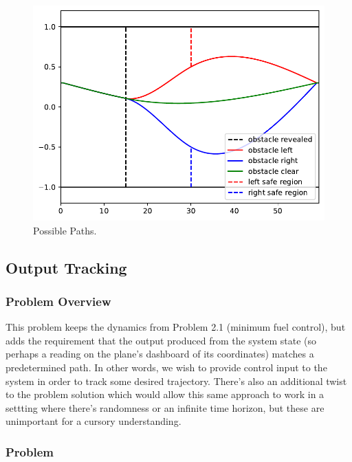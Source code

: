 \documentclass[12pt,reqno]{article}
\theoremstyle{definition}
\numberwithin{equation}{section}
\begin{document}
\begin{figure}[htbp]
    \centering
    \includegraphics[width=\linewidth]{../examples/364a/path_plan_cont.pdf}
    \caption{Possible Paths.}
    \label{fig:path_plan}
\end{figure}

\subsection{Output Tracking}

\subsubsection*{Problem Overview}

This problem keeps the dynamics from Problem 2.1 (minimum fuel control), but 
adds the requirement that the output produced from the system state (so perhaps a reading
on the plane's dashboard of its coordinates) matches a predetermined path. In other words, we
wish to provide control input to the system in order to track some desired trajectory. There's also
an additional twist to the problem solution which would allow this same approach
to work in a settting where there's randomness or an infinite time horizon, but these
are unimportant for a cursory understanding.

\subsubsection*{Problem}
\end{document}
